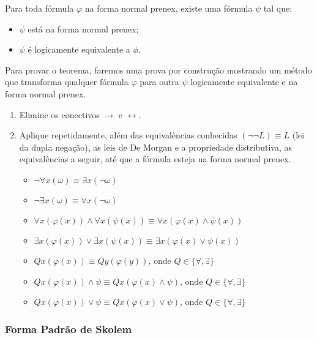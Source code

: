 \begin{theorem}{}
    Para toda fórmula $\varphi$ na forma normal prenex, existe uma fórmula $\psi$ tal que:
    \begin{itemize}
        \item $\psi$ está na forma normal prenex;
        \item $\psi$ é logicamente equivalente a $\phi$.
    \end{itemize}
    Para provar o teorema, faremos uma prova por construção mostrando um método que transforma qualquer fórmula $\varphi$ para outra $\psi$ logicamente equivalente e na forma normal prenex.
    \begin{enumerate}
        \item Elimine os conectivos $\rightarrow$ e $\leftrightarrow$.
        \item Aplique repetidamente, além das equivalências conhecidas $(\neg \neg L) \equiv L$ (lei da dupla negação), as leis de De Morgan e a propriedade distributiva, as equivalências a seguir, até que a fórmula esteja na forma normal prenex.
        \begin{itemize}
            \item $\neg \forall x (\omega) \equiv \exists x (\neg \omega)$
            \item $\neg \exists x (\omega) \equiv \forall x (\neg \omega)$
            \item $\forall x (\varphi(x)) \land \forall x (\psi(x)) \equiv \forall x (\varphi(x) \land \psi(x))$
            \item $\exists x (\varphi(x)) \lor \exists x (\psi(x)) \equiv \exists x (\varphi(x) \lor \psi(x))$
            \item $Q x (\varphi(x))\equiv Q y(\varphi(y))$, onde $Q \in \{\forall, \exists\}$
            \item $Q x (\varphi(x)) \land \psi \equiv Q x (\varphi(x) \land \psi)$, onde $Q \in \{\forall, \exists\}$ 
            \item $Q x (\varphi(x)) \lor \psi \equiv Q x (\varphi(x) \lor \psi)$, onde $Q \in \{\forall, \exists\}$ 
        \end{itemize}
    \end{enumerate}
\end{theorem}

\subsubsection{Forma Padrão de Skolem}

